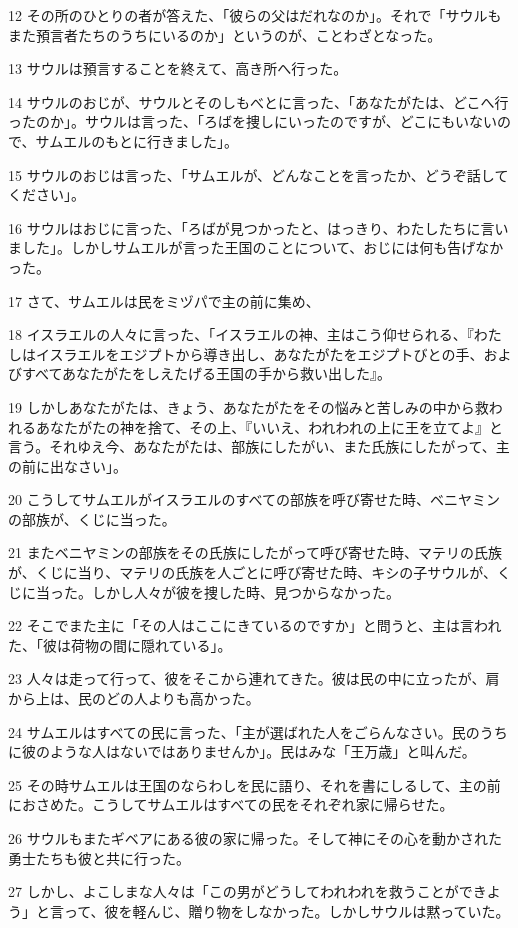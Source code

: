 \par 12 その所のひとりの者が答えた、「彼らの父はだれなのか」。それで「サウルもまた預言者たちのうちにいるのか」というのが、ことわざとなった。
\par 13 サウルは預言することを終えて、高き所へ行った。
\par 14 サウルのおじが、サウルとそのしもべとに言った、「あなたがたは、どこへ行ったのか」。サウルは言った、「ろばを捜しにいったのですが、どこにもいないので、サムエルのもとに行きました」。
\par 15 サウルのおじは言った、「サムエルが、どんなことを言ったか、どうぞ話してください」。
\par 16 サウルはおじに言った、「ろばが見つかったと、はっきり、わたしたちに言いました」。しかしサムエルが言った王国のことについて、おじには何も告げなかった。
\par 17 さて、サムエルは民をミヅパで主の前に集め、
\par 18 イスラエルの人々に言った、「イスラエルの神、主はこう仰せられる、『わたしはイスラエルをエジプトから導き出し、あなたがたをエジプトびとの手、およびすべてあなたがたをしえたげる王国の手から救い出した』。
\par 19 しかしあなたがたは、きょう、あなたがたをその悩みと苦しみの中から救われるあなたがたの神を捨て、その上、『いいえ、われわれの上に王を立てよ』と言う。それゆえ今、あなたがたは、部族にしたがい、また氏族にしたがって、主の前に出なさい」。
\par 20 こうしてサムエルがイスラエルのすべての部族を呼び寄せた時、ベニヤミンの部族が、くじに当った。
\par 21 またベニヤミンの部族をその氏族にしたがって呼び寄せた時、マテリの氏族が、くじに当り、マテリの氏族を人ごとに呼び寄せた時、キシの子サウルが、くじに当った。しかし人々が彼を捜した時、見つからなかった。
\par 22 そこでまた主に「その人はここにきているのですか」と問うと、主は言われた、「彼は荷物の間に隠れている」。
\par 23 人々は走って行って、彼をそこから連れてきた。彼は民の中に立ったが、肩から上は、民のどの人よりも高かった。
\par 24 サムエルはすべての民に言った、「主が選ばれた人をごらんなさい。民のうちに彼のような人はないではありませんか」。民はみな「王万歳」と叫んだ。
\par 25 その時サムエルは王国のならわしを民に語り、それを書にしるして、主の前におさめた。こうしてサムエルはすべての民をそれぞれ家に帰らせた。
\par 26 サウルもまたギベアにある彼の家に帰った。そして神にその心を動かされた勇士たちも彼と共に行った。
\par 27 しかし、よこしまな人々は「この男がどうしてわれわれを救うことができよう」と言って、彼を軽んじ、贈り物をしなかった。しかしサウルは黙っていた。

